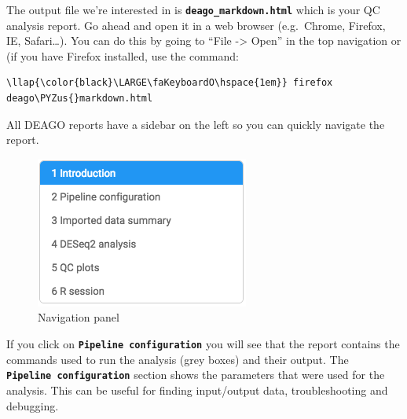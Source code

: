 \documentclass[11pt]{article}
\makeatletter
\def\maxwidth{\ifdim\Gin@nat@width>\linewidth\linewidth
    \else\Gin@nat@width\fi}
\let\Oldincludegraphics\includegraphics
\renewcommand{\includegraphics}[1]{\Oldincludegraphics[width=.8\maxwidth, height=.55\textheight, keepaspectratio]{#1}}
\def\PYZus{\char`\_}
\makeatother
\begin{document}
The output file we're interested in is
\textbf{\texttt{deago\_markdown.html}} which is your QC analysis report.
Go ahead and open it in a web browser (e.g.~Chrome, Firefox, IE,
Safari\ldots{}). You can do this by going to ``File -\textgreater{}
Open'' in the top navigation or (if you have Firefox installed, use the
command:

\begin{terminalinput}
\begin{Verbatim}[commandchars=\\\{\}]
\llap{\color{black}\LARGE\faKeyboardO\hspace{1em}} firefox deago\PYZus{}markdown.html
\end{Verbatim}
\end{terminalinput}

    All DEAGO reports have a sidebar on the left so you can quickly navigate
the report.

    \begin{figure}[!h]
\centering
\includegraphics{images/deago_navigation.png}
\caption{Navigation panel}
\end{figure}

    If you click on \textbf{\texttt{Pipeline\ configuration}} you will see
that the report contains the commands used to run the analysis (grey
boxes) and their output. The \textbf{\texttt{Pipeline\ configuration}}
section shows the parameters that were used for the analysis. This can
be useful for finding input/output data, troubleshooting and debugging.
\end{document}
